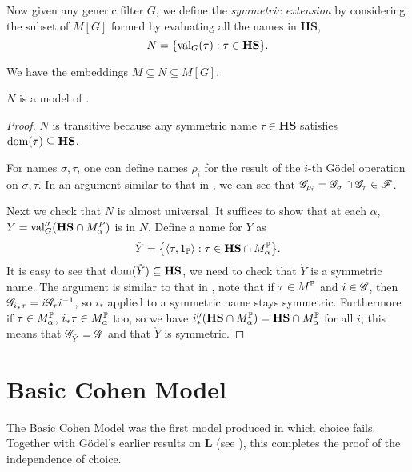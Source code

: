 \begin{definition}
    Now given any generic filter \(G\), we define the \emph{symmetric extension}
    by considering the subset of \(M[G]\) formed by evaluating all the names in \(\mathbf{HS}\),
    \[ N = \set{ \val_G(\tau): \tau\in \mathbf{HS} }. \]
\end{definition}
\begin{observation}
    We have the embeddings \(M \subseteq N \subseteq M[G]\).
\end{observation}

\begin{theorem}
    \(N\) is a model of \ZF.
\end{theorem}
\begin{proof}
    \(N\) is transitive because any symmetric name \(\tau\in \mathbf{HS}\) satisfies \(\dom(\tau)\subseteq \mathbf{HS}\).

    For names \(\sigma,\tau\), one can define names \(\rho_i\) for the result of the \(i\)-th Gödel operation on \(\sigma, \tau\).
    In an argument similar to that in , we can see that \(\G_{\rho_i} = \G_\sigma \cap \G_\tau \in \mathscr{F}\).

    Next we check that \(N\) is almost universal.
    It suffices to show that at each \(\alpha\), \(Y = \val_G''(\mathbf{HS} \cap M^P_\alpha)\) is in \(N\).
    Define a name for \(Y\) as
    \[ \mathring{Y} = \set{ \Angle{\tau,1_\P}: \tau\in \mathbf{HS} \cap  M^\P_\alpha }. \]
    It is easy to see that \(\dom(\mathring{Y}) \subseteq \mathbf{HS}\), we need to check that \(\mathring{Y}\) is a symmetric name.
    The argument is similar to that in ,
    note that if \(\tau\in M^\P\) and \(i\in\G\), then \(\G_{i_* \tau} = i \G_\tau i^{-1}\),
    so \(i_*\) applied to a symmetric name stays symmetric.
    Furthermore if \(\tau\in M^\P_\alpha\), \(i_* \tau\in M^\P_\alpha\) too,
    so we have \(i_*''(\mathbf{HS} \cap  M^\P_\alpha) = \mathbf{HS} \cap  M^\P_\alpha \) for all \(i\),
    this means that \(\G_{\mathring{Y}} = \G\) and that \(\mathring{Y}\) is symmetric.
\end{proof}

\section{Basic Cohen Model}

\newcommand*{\Fn}{\operatorname{\mathsf{Fn}}}
The Basic Cohen Model was the first model produced in which choice fails.
Together with Gödel's earlier results on \(\mathbf{L}\) (see ),
this completes the proof of the independence of choice.

